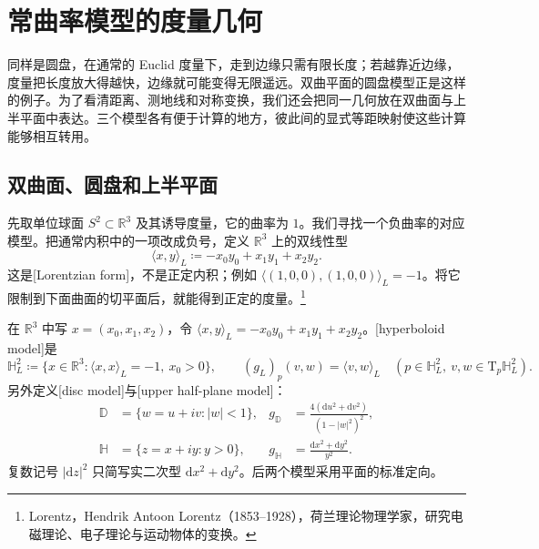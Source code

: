 
% 
% 

\section{常曲率模型的度量几何}
\label{g1:sec:1001}

同样是圆盘，在通常的 Euclid 度量下，走到边缘只需有限长度；若越靠近边缘，度量把长度放大得越快，边缘就可能变得无限遥远。双曲平面的圆盘模型正是这样的例子。为了看清距离、测地线和对称变换，我们还会把同一几何放在双曲面与上半平面中表达。三个模型各有便于计算的地方，彼此间的显式等距映射使这些计算能够相互转用。

\subsection{双曲面、圆盘和上半平面}
\label{g1:subsec:1001:01}

先取单位球面 \(S^2\subset\mathbb R^3\) 及其诱导度量，它的曲率为 \(1\)。我们寻找一个负曲率的对应模型。把通常内积中的一项改成负号，定义 \(\mathbb R^3\) 上的双线性型
\[
	\langle x,y\rangle_L\coloneqq-x_0y_0+x_1y_1+x_2y_2.
\]
这是[Lorentzian form]，不是正定内积；例如 \(\langle(1,0,0),(1,0,0)\rangle_L=-1\)。将它限制到下面曲面的切平面后，就能得到正定的度量。\footnote{Lorentz，Hendrik Antoon Lorentz（1853--1928），荷兰理论物理学家，研究电磁理论、电子理论与运动物体的变换。}

\begin{definition}
	\label{g1:def:hyperbolic-models}
	在 \(\mathbb R^3\) 中写 \(x=(x_0,x_1,x_2)\)，令 \(\langle x,y\rangle_L=-x_0y_0+x_1y_1+x_2y_2\)。[hyperboloid model]是
	\[
		\mathbb H_L^2\coloneqq\{x\in\mathbb R^3:\langle x,x\rangle_L=-1,\ x_0>0\},
		\qquad (g_L)_p(v,w)=\langle v,w\rangle_L\quad(p\in\mathbb H_L^2,\ v,w\in\mathrm T_p\mathbb H_L^2).
	\]
	另外定义[disc model]与[upper half-plane model]：
	\begin{align*}
		\mathbb D&=\{w=u+iv:|w|<1\},&
		g_{\mathbb D}&=\frac{4(\mathrm{d}u^2+\mathrm{d}v^2)}{(1-|w|^2)^2},\\
		\mathbb H&=\{z=x+iy:y>0\},&
		g_{\mathbb H}&=\frac{\mathrm{d}x^2+\mathrm{d}y^2}{y^2}.
	\end{align*}
	复数记号 \(|\mathrm{d}z|^2\) 只简写实二次型 \(\mathrm{d}x^2+\mathrm{d}y^2\)。后两个模型采用平面的标准定向。
\end{definition}

